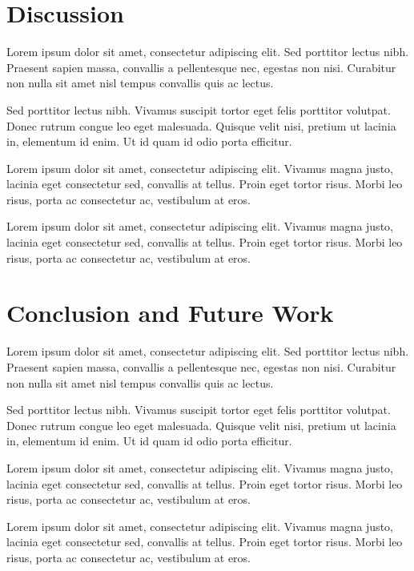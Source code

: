 \documentclass[12pt,twocolumn]{article}
\begin{document}
\section{Discussion}

Lorem ipsum dolor sit amet, consectetur adipiscing elit. Sed porttitor lectus nibh. Praesent sapien massa, convallis a pellentesque nec, egestas non nisi. Curabitur non nulla sit amet nisl tempus convallis quis ac lectus.

Sed porttitor lectus nibh. Vivamus suscipit tortor eget felis porttitor volutpat. Donec rutrum congue leo eget malesuada. Quisque velit nisi, pretium ut lacinia in, elementum id enim. Ut id quam id odio porta efficitur.

Lorem ipsum dolor sit amet, consectetur adipiscing elit. Vivamus magna justo, lacinia eget consectetur sed, convallis at tellus. Proin eget tortor risus. Morbi leo risus, porta ac consectetur ac, vestibulum at eros.

Lorem ipsum dolor sit amet, consectetur adipiscing elit. Vivamus magna justo, lacinia eget consectetur sed, convallis at tellus. Proin eget tortor risus. Morbi leo risus, porta ac consectetur ac, vestibulum at eros.

\section{Conclusion and Future Work}

Lorem ipsum dolor sit amet, consectetur adipiscing elit. Sed porttitor lectus nibh. Praesent sapien massa, convallis a pellentesque nec, egestas non nisi. Curabitur non nulla sit amet nisl tempus convallis quis ac lectus.

Sed porttitor lectus nibh. Vivamus suscipit tortor eget felis porttitor volutpat. Donec rutrum congue leo eget malesuada. Quisque velit nisi, pretium ut lacinia in, elementum id enim. Ut id quam id odio porta efficitur.

Lorem ipsum dolor sit amet, consectetur adipiscing elit. Vivamus magna justo, lacinia eget consectetur sed, convallis at tellus. Proin eget tortor risus. Morbi leo risus, porta ac consectetur ac, vestibulum at eros.

Lorem ipsum dolor sit amet, consectetur adipiscing elit. Vivamus magna justo, lacinia eget consectetur sed, convallis at tellus. Proin eget tortor risus. Morbi leo risus, porta ac consectetur ac, vestibulum at eros.

\clearpage

\onecolumn


\end{document}

